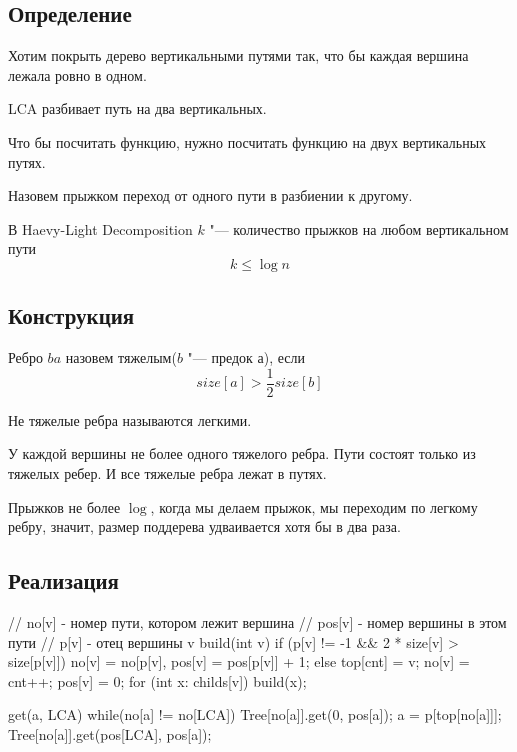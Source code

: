 \subsection{Определение}

Хотим покрыть дерево вертикальными путями так, что бы каждая вершина лежала ровно в одном.


LCA разбивает путь на два вертикальных.

Что бы посчитать функцию, нужно посчитать функцию на двух вертикальных путях.


\begin{Def}
	Назовем прыжком переход от одного пути в разбиении к другому.
\end{Def}

В Haevy-Light Decomposition $k$ "--- количество прыжков на любом вертикальном пути
\[ k \le \log n \]

\subsection{Конструкция}
\begin{Def}
	Ребро $ba$ назовем тяжелым($b$ "--- предок $а$), если
	\[ size[a] > \frac{1}{2}size[b] \]
\end{Def}
\begin{Def}
	Не тяжелые ребра называются легкими.
\end{Def}

У каждой вершины не более одного тяжелого ребра.
Пути состоят только из тяжелых ребер.
И все тяжелые ребра лежат в путях.

Прыжков не более $\log$, когда мы делаем прыжок, мы переходим по легкому ребру, значит, размер поддерева удваивается хотя бы в два раза.

\subsection{Реализация}

\begin{cppcode}
// no[v] - номер пути, котором лежит вершина
// pos[v] - номер вершины в этом пути
// p[v] - отец вершины v
build(int v) {
	if (p[v] != -1 && 2 * size[v] > size[p[v]]) {
		no[v] = no[p[v], pos[v] = pos[p[v]] + 1;
	} else {
		top[cnt] = v;
		no[v] = cnt++;
		pos[v] = 0;
	}
	for (int x: childs[v])
		build(x);
}

get(a, LCA) {
	while(no[a] != no[LCA]) {
		Tree[no[a]].get(0, pos[a]);
		a = p[top[no[a]]];
	}
	Tree[no[a]].get(pos[LCA], pos[a]);
}
\end{cppcode}

